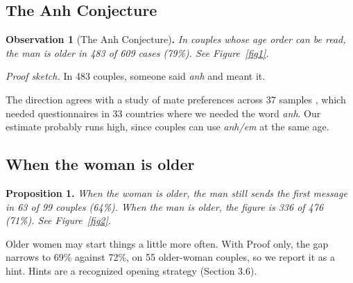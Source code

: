 \documentclass[10pt,letterpaper]{article}
\begin{document}
\subsection{The Anh Conjecture}
\textbf{Observation 1} (The Anh Conjecture)\textbf{.} \emph{In couples whose age order can be read, the man is older in 483 of 609 cases (79\%). See Figure~\ref{fig1}.}

\emph{Proof sketch.} In 483 couples, someone said \emph{anh} and meant it.

The direction agrees with a study of mate preferences across 37 samples \cite{buss}, which needed questionnaires in 33 countries where we needed the word \emph{anh}. Our estimate probably runs high, since couples can use \emph{anh/em} at the same age.

\subsection{When the woman is older}
\textbf{Proposition 1}\textbf{.} \emph{When the woman is older, the man still sends the first message in 63 of 99 couples (64\%). When the man is older, the figure is 336 of 476 (71\%). See Figure~\ref{fig2}.}

Older women may start things a little more often. With Proof only, the gap narrows to 69\% against 72\%, on 55 older-woman couples, so we report it as a hint. Hints are a recognized opening strategy (Section 3.6).
\end{document}
